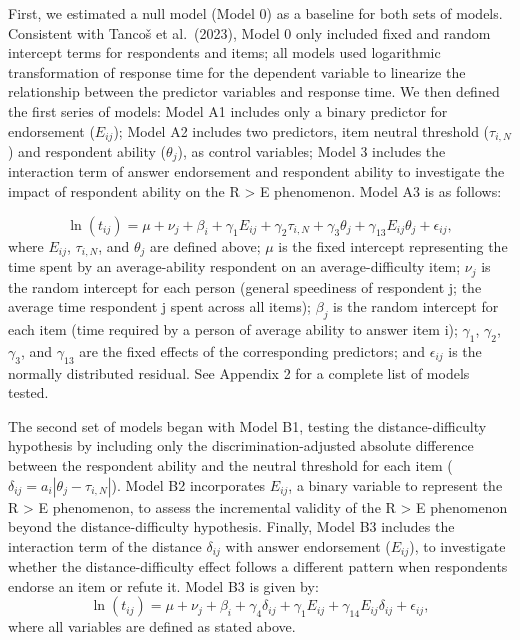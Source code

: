 \documentclass[
  number]{elsarticle}
\begin{document}
First, we estimated a null model (Model 0) as a baseline for both sets
of models. Consistent with Tancoš et al.~(2023), Model 0 only included
fixed and random intercept terms for respondents and items; all models
used logarithmic transformation of response time for the dependent
variable to linearize the relationship between the predictor variables
and response time. We then defined the first series of models: Model A1
includes only a binary predictor for endorsement (\(E_{ij}\)); Model A2
includes two predictors, item neutral threshold (\(\tau_{i,N}\)) and
respondent ability (\(\theta_j\)), as control variables; Model 3
includes the interaction term of answer endorsement and respondent
ability to investigate the impact of respondent ability on the R
\textgreater{} E phenomenon. Model A3 is as follows:

\[\ln{(t_{ij})}=\mu + \nu_j +\beta_i+\gamma_1E_{ij}+\gamma_2\tau_{i,N}+\gamma_3\theta_j +\gamma_{13}E_{ij}\theta_j+\epsilon_{ij},\]
where \(E_{ij}\), \(\tau_{i,N}\), and \(\theta_j\) are defined above;
\(\mu\) is the fixed intercept representing the time spent by an
average-ability respondent on an average-difficulty item; \(\nu_j\) is
the random intercept for each person (general speediness of respondent
j; the average time respondent j spent across all items); \(\beta_j\) is
the random intercept for each item (time required by a person of average
ability to answer item i); \(\gamma_1\), \(\gamma_2\), \(\gamma_3\), and
\(\gamma_{13}\) are the fixed effects of the corresponding predictors;
and \(\epsilon_{ij}\) is the normally distributed residual. See Appendix
2 for a complete list of models tested.

The second set of models began with Model B1, testing the
distance-difficulty hypothesis by including only the
discrimination-adjusted absolute difference between the respondent
ability and the neutral threshold for each item
(\(\delta_{ij}=a_i |θ_j-τ_{i,N} |\)). Model B2 incorporates \(E_{ij}\),
a binary variable to represent the R \textgreater{} E phenomenon, to
assess the incremental validity of the R \textgreater{} E phenomenon
beyond the distance-difficulty hypothesis. Finally, Model B3 includes
the interaction term of the distance \(\delta_{ij}\) with answer
endorsement (\(E_{ij}\)), to investigate whether the distance-difficulty
effect follows a different pattern when respondents endorse an item or
refute it. Model B3 is given by:
\[\ln{(t_{ij})}=\mu+\nu_j+\beta_i+\gamma_4 \delta_{ij}+\gamma_1 E_{ij}+\gamma_{14} E_{ij}\delta_{ij}+\epsilon_{ij},\]
where all variables are defined as stated above.
\end{document}
